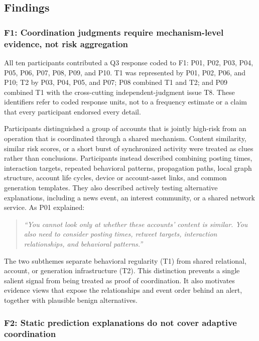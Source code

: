 \subsection{Findings}
\label{sec:formative-findings}

\subsubsection{F1: Coordination judgments require mechanism-level evidence, not risk aggregation}
\label{sec:f1}

All ten participants contributed a Q3 response coded to F1: P01, P02, P03,
P04, P05, P06, P07, P08, P09, and P10. T1 was represented by P01, P02, P06,
and P10; T2 by P03, P04, P05, and P07; P08 combined T1 and T2; and P09
combined T1 with the cross-cutting independent-judgment issue T8. These
identifiers refer to coded response units, not to a frequency estimate or a
claim that every participant endorsed every detail.

Participants distinguished a group of accounts that is jointly high-risk from
an operation that is coordinated through a shared mechanism. Content
similarity, similar risk scores, or a short burst of synchronized activity were
treated as clues rather than conclusions. Participants instead described
combining posting times, interaction targets, repeated behavioral patterns,
propagation paths, local graph structure, account life cycles, device or
account-asset links, and common generation templates. They also described
actively testing alternative explanations, including a news event, an interest
community, or a shared network service. As P01 explained:

\begin{quote}
\emph{``You cannot look only at whether these accounts' content is similar. You also need to consider posting times, retweet targets, interaction relationships, and behavioral patterns.''}
\end{quote}

The two subthemes separate behavioral regularity (T1) from shared relational,
account, or generation infrastructure (T2). This distinction prevents a
single salient signal from being treated as proof of coordination. It also
motivates evidence views that expose the relationships and event order behind
an alert, together with plausible benign alternatives.

\subsubsection{F2: Static prediction explanations do not cover adaptive coordination}
\label{sec:f2}

